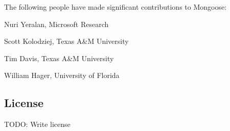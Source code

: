 The following people have made significant contributions to Mongoose\+:


\begin{DoxyItemize}
\item Nuri Yeralan, Microsoft Research
\item Scott Kolodziej, Texas A\&M University
\item Tim Davis, Texas A\&M University
\item William Hager, University of Florida
\end{DoxyItemize}

\subsection*{License}

T\+O\+DO\+: Write license 